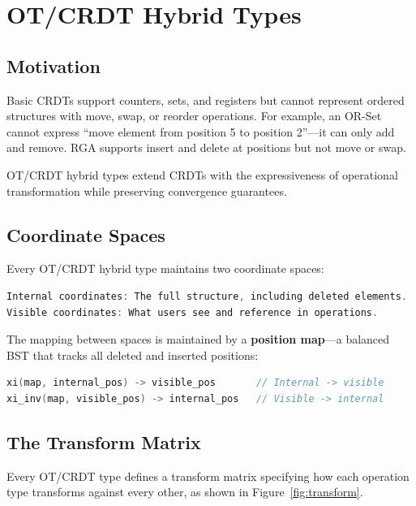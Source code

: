 \documentclass[sigconf,nonacm]{acmart}
\begin{document}
\section{OT/CRDT Hybrid Types}

\subsection{Motivation}

Basic CRDTs support counters, sets, and registers but cannot represent ordered structures with move, swap, or reorder operations. For example, an OR-Set cannot express ``move element from position 5 to position 2''---it can only add and remove. RGA supports insert and delete at positions but not move or swap.

OT/CRDT hybrid types extend CRDTs with the expressiveness of operational transformation while preserving convergence guarantees.

\subsection{Coordinate Spaces}

Every OT/CRDT hybrid type maintains two coordinate spaces:

\begin{lstlisting}[language=C]
Internal coordinates: The full structure, including deleted elements.
Visible coordinates: What users see and reference in operations.
\end{lstlisting}

The mapping between spaces is maintained by a \textbf{position map}---a balanced BST that tracks all deleted and inserted positions:

\begin{lstlisting}[language=C]
xi(map, internal_pos) -> visible_pos       // Internal -> visible
xi_inv(map, visible_pos) -> internal_pos   // Visible -> internal
\end{lstlisting}

\subsection{The Transform Matrix}

Every OT/CRDT type defines a transform matrix specifying how each operation type transforms against every other, as shown in Figure~\ref{fig:transform}.
\end{document}
